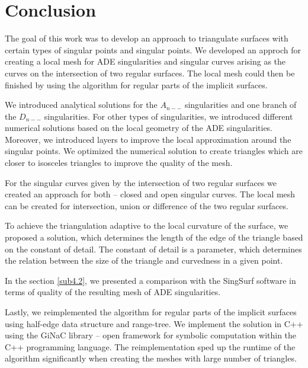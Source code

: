 \chapter*{Conclusion}  %
The goal of this work was to develop an approach to triangulate
surfaces with certain types of singular points and singular points.
We developed an approch for creating a local mesh for ADE singularities
and singular curves arising as the curves on the intersection of two regular
surfaces.
The local mesh could then be finished by using the 
algorithm for regular parts of the implicit surfaces.

We introduced analytical solutions for the $A_{n--}$ singularities and
one branch of the $D_{n--}$ singularities. For other types of singularities, we 
introduced different numerical solutions based on the local geometry of 
the ADE singularities. Moreover, we introduced layers to improve the local 
approximation around the singular points. We optimized the numerical solution
to create triangles which are closer to isosceles triangles to improve the 
quality of the mesh.

For the singular curves given by the intersection of two regular surfaces
we created an approach for both -- closed and open singular curves.
The local mesh can be created for intersection, union or difference of the
two regular surfaces.

To achieve the triangulation adaptive to the local curvature of the surface,
we proposed a solution, which determines the length of the edge of the triangle
based on the constant of detail. The constant of detail is a parameter,
which determines the relation between the size of the triangle and curvedness
in a given point.

In the section \ref{sub4.2}, we presented a comparison with the SingSurf software 
\cite{morris2003client} in terms of quality of the resulting mesh of ADE singularities.

Lastly, we reimplemented the algorithm for regular parts of the implicit surfaces
using half-edge data structure and range-tree. We implement the solution in C++
using the GiNaC library \cite{bauer2002introduction} -- open framework for symbolic 
computation within the C++ programming language.
The reimplementation sped up the
runtime of the algorithm significantly when creating the meshes with large number
of triangles.

